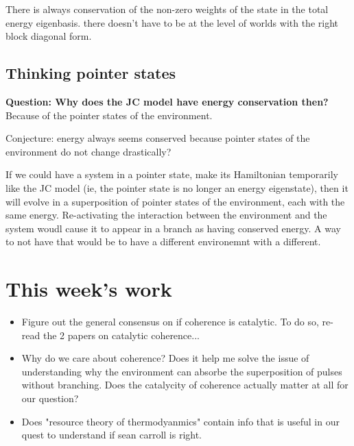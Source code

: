 \documentclass{article}
\begin{document}
There is always conservation of the non-zero weights of the state in the total energy eigenbasis. there doesn't have to be at the level of worlds with the right block diagonal form. 


\subsection{Thinking pointer states}

\textbf{Question: Why does the JC model have energy conservation then?}
Because of the pointer states of the environment. 

Conjecture: energy always seems conserved because pointer states of the environment do not change drastically? 

If we could have a system in a pointer state, make its Hamiltonian temporarily like the JC model (ie, the pointer state is no longer an energy eigenstate), then it will evolve in a superposition of pointer states of the environment, each with the same energy. Re-activating the interaction between the environment and the system woudl cause it to appear in a branch as having conserved energy. A way to not have that would be to have a different environemnt with a different.



\section*{This week's work}

\begin{itemize}
    \item Figure out the general consensus on if coherence is catalytic. To do so, re-read the 2 papers on catalytic coherence...
    \item Why do we care about coherence? Does it help me solve the issue of understanding why the environment can absorbe the superposition of pulses without branching. Does the catalycity of coherence actually matter at all for our question?
    \item Does "resource theory of thermodyanmics" contain info that is useful in our quest to understand if sean carroll is right.
\end{itemize}
\end{document}
